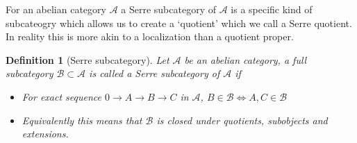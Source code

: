 \documentclass[12pt]{report}
\numberwithin{equation}{section}
\newtheorem{definition}[dummy]{Definition}
\newtheorem{example}[dummy]{Example}
\begin{document}
%		
%			
%		
		For an abelian category $\mathcal{A}$ a Serre subcategory of $\mathcal{A}$ is a specific kind of subcateogry which allows us to create a `quotient' which we call a Serre quotient. In reality this is more akin to a localization than a quotient proper. 
	
	\begin{definition}[Serre subcategory]
		Let $\mathcal{A}$ be an abelian category, a full subcategory $\mathcal{B} \subset \mathcal{A}$ is called a Serre subcategory of $\mathcal{A}$ if \begin{itemize}
			\item For exact sequence $0 \to A \to B \to C $ in $\mathcal{A}$, $B \in \mathcal{B} \iff A,C \in \mathcal{B}$
			\item Equivalently this means that $\mathcal{B}$ is closed under quotients, subobjects and extensions.
		\end{itemize}
	\end{definition}
	
\end{document}
